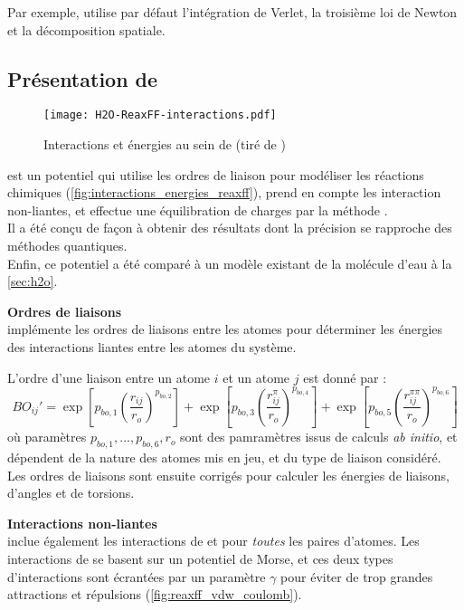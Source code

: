 Par exemple, \lammps{} utilise par défaut l'intégration de Verlet, la troisième loi de Newton et la décomposition spatiale.

    \subsection{Présentation de \reaxff{}} \label{sec:reaxff}

\begin{figure}[h!]
    \centering
    \texttt{[image: H2O-ReaxFF-interactions.pdf]}
    \caption{Interactions et énergies au sein de \reaxff{} (tiré de \cite{russo_atomistic-scale_2011})}
    \label{fig:interactions_energies_reaxff}
\end{figure}

\reaxff{}\cite{russo_atomistic-scale_2011}\cite{senftle_reaxff_2016} est un potentiel qui utilise les ordres de liaison pour modéliser les réactions chimiques (\autoref{fig:interactions_energies_reaxff}), prend en compte les interaction non-liantes, et effectue  une équilibration de charges par la méthode \qeq{}.\\
Il a été conçu de façon à obtenir des résultats dont la précision se rapproche des méthodes quantiques.\\
Enfin, ce potentiel a été comparé à un modèle existant de la molécule d'eau à la \autoref{sec:h2o}.

\textbf{Ordres de liaisons}\\
\reaxff{} implémente les ordres de liaisons entre les atomes pour déterminer les énergies des interactions liantes entre les atomes du système.

L'ordre d'une liaison entre un atome $i$ et un atome $j$ est donné par :
\begin{equation}
    BO_{ij}' = \exp \left[p_{bo, 1} \left(\frac{r_{ij}}{r_o}\right)^{p_{bo,2}}\right] + \exp \left[p_{bo,3} \left(\frac{r_{ij}^\pi}{r_o}\right)^{p_{bo,4}}\right] + \exp \left[p_{bo,5} \left(\frac{r_{ij}^{\pi\pi}}{r_o}\right)^{p_{bo,6}}\right]
    \label{eq:ordres_liaisons_reaxff}
\end{equation}
où paramètres $p_{bo,1}, \dots, p_{bo,6}, r_o$ sont des pamramètres issus de calculs \textit{ab initio}, et dépendent de la nature des atomes mis en jeu, et du type de liaison considéré. Les ordres de liaisons sont ensuite corrigés pour calculer les énergies de liaisons, d'angles et de torsions.

\textbf{Interactions non-liantes}\\
\reaxff{} inclue également les interactions de \vdw{} et \coulomb{} pour \emph{toutes} les paires d'atomes. Les interactions de \vdw{} se basent sur un potentiel de Morse, et ces deux types d'interactions sont écrantées par un paramètre $\gamma$ pour éviter de trop grandes attractions et répulsions (\autoref{fig:reaxff_vdw_coulomb}).

